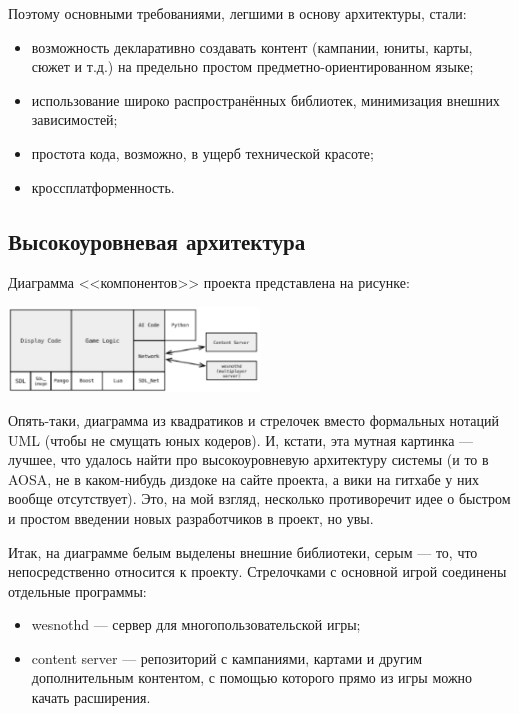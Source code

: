 \documentclass[a5paper]{article}
\begin{document}
Поэтому основными требованиями, легшими в основу архитектуры, стали:
\begin{itemize}
    \item возможность декларативно создавать контент (кампании, юниты, карты, сюжет и т.д.) на предельно простом предметно-ориентированном языке;
    \item использование широко распространённых библиотек, минимизация внешних зависимостей;
    \item простота кода, возможно, в ущерб технической красоте;
    \item кроссплатформенность.
\end{itemize}

\subsection{Высокоуровневая архитектура}

Диаграмма <<компонентов>> проекта представлена на рисунке:

\begin{center}
    \includegraphics[width=0.5\textwidth]{wesnothArchitecture.png}
\end{center}

Опять-таки, диаграмма из квадратиков и стрелочек вместо формальных нотаций UML (чтобы не смущать юных кодеров). И, кстати, эта мутная картинка --- лучшее, что удалось найти про высокоуровневую архитектуру системы (и то в AOSA, не в каком-нибудь диздоке на сайте проекта, а вики на гитхабе у них вообще отсутствует). Это, на мой взгляд, несколько противоречит идее о быстром и простом введении новых разработчиков в проект, но увы.

Итак, на диаграмме белым выделены внешние библиотеки, серым --- то, что непосредственно относится к проекту. Стрелочками с основной игрой соединены отдельные программы:

\begin{itemize}
    \item wesnothd --- сервер для многопользовательской игры;
    \item content server --- репозиторий с кампаниями, картами и другим дополнительным контентом, с помощью которого прямо из игры можно качать расширения.
\end{itemize}
\end{document}
